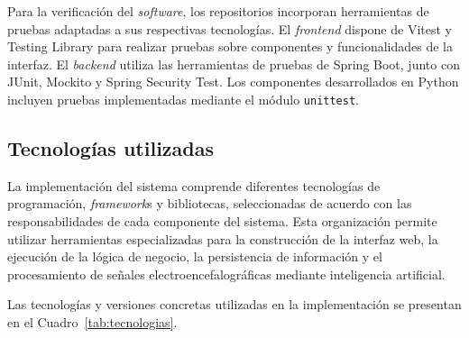 Para la verificación del \textit{software}, los repositorios incorporan herramientas de pruebas adaptadas a sus respectivas tecnologías. El \textit{frontend} dispone de Vitest y Testing Library para realizar pruebas sobre componentes y funcionalidades de la interfaz. El \textit{backend} utiliza las herramientas de pruebas de Spring Boot, junto con JUnit, Mockito y Spring Security Test. Los componentes desarrollados en Python incluyen pruebas implementadas mediante el módulo \texttt{unittest}.

\subsection{Tecnologías utilizadas}

La implementación del sistema comprende diferentes tecnologías de
programación, \textit{framework}s y bibliotecas, seleccionadas de acuerdo con
las responsabilidades de cada componente del sistema. Esta organización
permite utilizar herramientas especializadas para la construcción de
la interfaz web, la ejecución de la lógica de negocio, la persistencia
de información y el procesamiento de señales electroencefalográficas
mediante inteligencia artificial.

Las tecnologías y versiones concretas utilizadas
en la implementación se presentan en el
Cuadro~\ref{tab:tecnologias}.

\begingroup
\small
\setlength{\tabcolsep}{3pt}
\renewcommand{\arraystretch}{1.08}
\setlength{\LTleft}{0pt}
\setlength{\LTright}{0pt}


